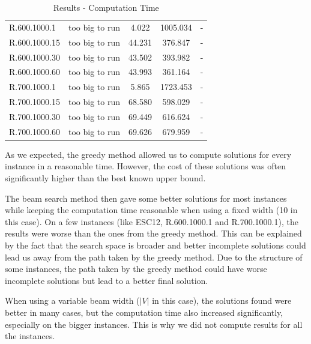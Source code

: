 \documentclass[]{article}
\begin{document}
\begin{table}[H]
\begin{tabular}{lcccc}
			R.600.1000.1  & too big to run & 4.022         & 1005.034    & -             \\
			R.600.1000.15 & too big to run & 44.231        & 376.847     & -             \\
			R.600.1000.30 & too big to run & 43.502        & 393.982     & -             \\
			R.600.1000.60 & too big to run & 43.993        & 361.164     & -             \\
			R.700.1000.1  & too big to run & 5.865         & 1723.453    & -             \\
			R.700.1000.15 & too big to run & 68.580        & 598.029     & -             \\
			R.700.1000.30 & too big to run & 69.449        & 616.624     & -             \\
			R.700.1000.60 & too big to run & 69.626        & 679.959     & -             \\
		\end{tabular}
		\caption{Results - Computation Time}
		\label{table:results_time}
	\end{table}

	As we expected, the greedy method allowed us to compute solutions for every instance in a reasonable time. However, the cost of these solutions was often significantly higher than the best known upper bound.
	
	The beam search method then gave some better solutions for most instances while keeping the computation time reasonable when using a fixed width (10 in this case). On a few instances (like ESC12, R.600.1000.1 and R.700.1000.1), the results were worse than the ones from the greedy method. This can be explained by the fact that the search space is broader and better incomplete solutions could lead us away from the path taken by the greedy method. Due to the structure of some instances, the path taken by the greedy method could have worse incomplete solutions but lead to a better final solution.
	
	When using a variable beam width ($|V|$ in this case), the solutions found were better in many cases, but the computation time also increased significantly, especially on the bigger instances. This is why we did not compute results for all the instances.

    \newpage

	 
	
\end{document}
